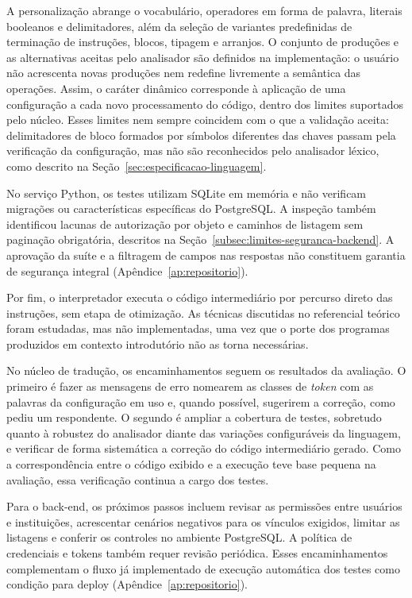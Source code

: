 A personalização abrange o vocabulário, operadores em forma de palavra, literais booleanos e delimitadores, além da seleção de variantes predefinidas de terminação de instruções, blocos, tipagem e arranjos. O conjunto de produções e as alternativas aceitas pelo analisador são definidos na implementação: o usuário não acrescenta novas produções nem redefine livremente a semântica das operações. Assim, o caráter dinâmico corresponde à aplicação de uma configuração a cada novo processamento do código, dentro dos limites suportados pelo núcleo. Esses limites nem sempre coincidem com o que a validação aceita: delimitadores de bloco formados por símbolos diferentes das chaves passam pela verificação da configuração, mas não são reconhecidos pelo analisador léxico, como descrito na Seção~\ref{sec:especificacao-linguagem}.

No serviço Python, os testes utilizam SQLite em memória e não verificam migrações ou características específicas do PostgreSQL. A inspeção também identificou lacunas de autorização por objeto e caminhos de listagem sem paginação obrigatória, descritos na Seção~\ref{subsec:limites-seguranca-backend}. A aprovação da suíte e a filtragem de campos nas respostas não constituem garantia de segurança integral (Apêndice~\ref{ap:repositorio}).

Por fim, o interpretador executa o código intermediário por percurso direto das instruções, sem etapa de otimização. As técnicas discutidas no referencial teórico foram estudadas, mas não implementadas, uma vez que o porte dos programas produzidos em contexto introdutório não as torna necessárias.

No núcleo de tradução, os encaminhamentos seguem os resultados da avaliação. O primeiro é fazer as mensagens de erro nomearem as classes de \textit{token} com as palavras da configuração em uso e, quando possível, sugerirem a correção, como pediu um respondente. O segundo é ampliar a cobertura de testes, sobretudo quanto à robustez do analisador diante das variações configuráveis da linguagem, e verificar de forma sistemática a correção do código intermediário gerado. Como a correspondência entre o código exibido e a execução teve base pequena na avaliação, essa verificação continua a cargo dos testes.

Para o back-end, os próximos passos incluem revisar as permissões entre usuários e instituições, acrescentar cenários negativos para os vínculos exigidos, limitar as listagens e conferir os controles no ambiente PostgreSQL. A política de credenciais e tokens também requer revisão periódica. Esses encaminhamentos complementam o fluxo já implementado de execução automática dos testes como condição para deploy \cite{owasp2026authorization,owasp2023recursos,owasp2026password} (Apêndice~\ref{ap:repositorio}).

